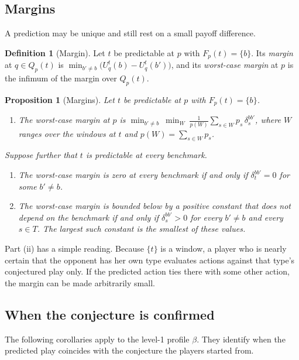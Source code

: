 \documentclass[12pt]{article}
\newtheorem{proposition}{Proposition}
\theoremstyle{definition}
\newtheorem{definition}{Definition}
\begin{document}
\subsection{Margins}

A prediction may be unique and still rest on a small payoff difference.

\begin{definition}[Margin]\label{def:margin}
Let $t$ be predictable at $p$ with $F_p(t) = \{b\}$. Its \emph{margin} at $q \in Q_p(t)$ is $\min_{b' \neq b} \bigl( U^t_q(b) - U^t_q(b') \bigr)$, and its \emph{worst-case margin} at $p$ is the infimum of the margin over $Q_p(t)$.
\end{definition}

\begin{proposition}[Margins]\label{prop:margins}
Let $t$ be predictable at $p$ with $F_p(t) = \{b\}$.
\begin{enumerate}
\item[(i)] The worst-case margin at $p$ is $\displaystyle \min_{b' \neq b} \ \min_{W} \ \frac{1}{p(W)} \sum_{s \in W} p_s\, \delta^{bb'}_s$, where $W$ ranges over the windows at $t$ and $p(W) = \sum_{s \in W} p_s$.
\end{enumerate}
Suppose further that $t$ is predictable at every benchmark.
\begin{enumerate}
\item[(ii)] The worst-case margin is zero at every benchmark if and only if $\delta^{bb'}_t = 0$ for some $b' \neq b$.
\item[(iii)] The worst-case margin is bounded below by a positive constant that does not depend on the benchmark if and only if $\delta^{bb'}_s > 0$ for every $b' \neq b$ and every $s \in T$. The largest such constant is the smallest of these values.
\end{enumerate}
\end{proposition}

Part (ii) has a simple reading. Because $\{t\}$ is a window, a player who is nearly certain that the opponent has her own type evaluates actions against that type's conjectured play only. If the predicted action ties there with some other action, the margin can be made arbitrarily small.

\subsection{When the conjecture is confirmed}

The following corollaries apply to the level-1 profile $\beta$. They identify when the predicted play coincides with the conjecture the players started from.
\end{document}
